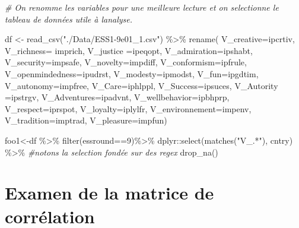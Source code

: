 \documentclass[
]{book}
\newenvironment{Shaded}{\begin{snugshade}}{\end{snugshade}}
\newcommand{\AttributeTok}[1]{\textcolor[rgb]{0.77,0.63,0.00}{#1}}
\newcommand{\CommentTok}[1]{\textcolor[rgb]{0.56,0.35,0.01}{\textit{#1}}}
\newcommand{\DecValTok}[1]{\textcolor[rgb]{0.00,0.00,0.81}{#1}}
\newcommand{\FunctionTok}[1]{\textcolor[rgb]{0.00,0.00,0.00}{#1}}
\newcommand{\NormalTok}[1]{#1}
\newcommand{\OtherTok}[1]{\textcolor[rgb]{0.56,0.35,0.01}{#1}}
\newcommand{\SpecialCharTok}[1]{\textcolor[rgb]{0.00,0.00,0.00}{#1}}
\newcommand{\StringTok}[1]{\textcolor[rgb]{0.31,0.60,0.02}{#1}}
\begin{document}
\begin{Shaded}
\begin{Highlighting}[]
\CommentTok{\# On renomme les variables pour une meilleure lecture et on selectionne le tableau de données utile à l\textquotesingle{}analyse.}

\NormalTok{df }\OtherTok{\textless{}{-}} \FunctionTok{read\_csv}\NormalTok{(}\StringTok{"./Data/ESS1{-}9e01\_1.csv"}\NormalTok{) }\SpecialCharTok{\%\textgreater{}\%}
  \FunctionTok{rename}\NormalTok{(}
    \AttributeTok{V\_creative=}\NormalTok{ipcrtiv,}
    \AttributeTok{V\_richness=}\NormalTok{ imprich,}
    \AttributeTok{V\_justice =}\NormalTok{ipeqopt, }
    \AttributeTok{V\_admiration=}\NormalTok{ipshabt, }
    \AttributeTok{V\_security=}\NormalTok{impsafe, }
    \AttributeTok{V\_novelty=}\NormalTok{impdiff, }
    \AttributeTok{V\_conformism=}\NormalTok{ipfrule, }
    \AttributeTok{V\_openmindedness=}\NormalTok{ipudrst, }
    \AttributeTok{V\_modesty=}\NormalTok{ipmodst, }
    \AttributeTok{V\_fun=}\NormalTok{ipgdtim, }
    \AttributeTok{V\_autonomy=}\NormalTok{impfree, }
    \AttributeTok{V\_Care=}\NormalTok{iphlppl, }
    \AttributeTok{V\_Success=}\NormalTok{ipsuces,}
    \AttributeTok{V\_Autority =}\NormalTok{ipstrgv, }
    \AttributeTok{V\_Adventures=}\NormalTok{ipadvnt,}
    \AttributeTok{V\_wellbehavior=}\NormalTok{ipbhprp,}
    \AttributeTok{V\_respect=}\NormalTok{iprspot,}
    \AttributeTok{V\_loyalty=}\NormalTok{iplylfr,}
    \AttributeTok{V\_environnement=}\NormalTok{impenv,}
    \AttributeTok{V\_tradition=}\NormalTok{imptrad, }
    \AttributeTok{V\_pleasure=}\NormalTok{impfun)}

\NormalTok{foo1}\OtherTok{\textless{}{-}}\NormalTok{df }\SpecialCharTok{\%\textgreater{}\%} \FunctionTok{filter}\NormalTok{(essround}\SpecialCharTok{==}\DecValTok{9}\NormalTok{)}\SpecialCharTok{\%\textgreater{}\%}
\NormalTok{  dplyr}\SpecialCharTok{::}\FunctionTok{select}\NormalTok{(}\FunctionTok{matches}\NormalTok{(}\StringTok{"V\_.*"}\NormalTok{), cntry) }\SpecialCharTok{\%\textgreater{}\%} \CommentTok{\#notons la selection fondée sur des regex}
  \FunctionTok{drop\_na}\NormalTok{()}
\end{Highlighting}
\end{Shaded}

\hypertarget{examen-de-la-matrice-de-corruxe9lation}{%
\section{Examen de la matrice de corrélation}\label{examen-de-la-matrice-de-corruxe9lation}}
\end{document}
